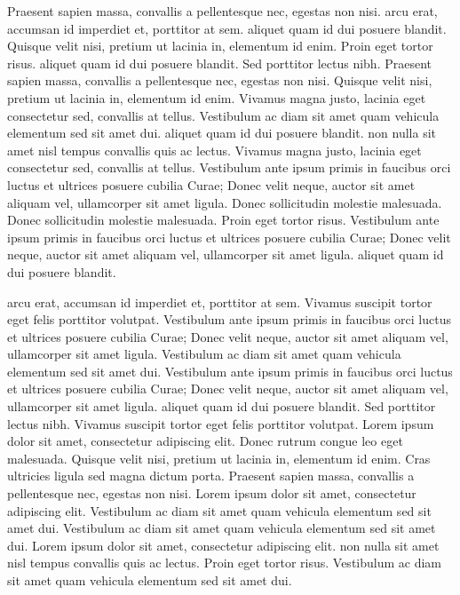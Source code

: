 \documentclass{article}
\begin{document}
Praesent sapien massa, convallis a pellentesque nec, egestas non nisi.  arcu erat, accumsan id imperdiet et, porttitor at sem.  aliquet quam id dui posuere blandit. Quisque velit nisi, pretium ut lacinia in, elementum id enim. Proin eget tortor risus.  aliquet quam id dui posuere blandit. Sed porttitor lectus nibh. Praesent sapien massa, convallis a pellentesque nec, egestas non nisi. Quisque velit nisi, pretium ut lacinia in, elementum id enim. Vivamus magna justo, lacinia eget consectetur sed, convallis at tellus. Vestibulum ac diam sit amet quam vehicula elementum sed sit amet dui.  aliquet quam id dui posuere blandit.  non nulla sit amet nisl tempus convallis quis ac lectus. Vivamus magna justo, lacinia eget consectetur sed, convallis at tellus. Vestibulum ante ipsum primis in faucibus orci luctus et ultrices posuere cubilia Curae; Donec velit neque, auctor sit amet aliquam vel, ullamcorper sit amet ligula. Donec sollicitudin molestie malesuada. Donec sollicitudin molestie malesuada. Proin eget tortor risus. Vestibulum ante ipsum primis in faucibus orci luctus et ultrices posuere cubilia Curae; Donec velit neque, auctor sit amet aliquam vel, ullamcorper sit amet ligula.  aliquet quam id dui posuere blandit.

 arcu erat, accumsan id imperdiet et, porttitor at sem. Vivamus suscipit tortor eget felis porttitor volutpat. Vestibulum ante ipsum primis in faucibus orci luctus et ultrices posuere cubilia Curae; Donec velit neque, auctor sit amet aliquam vel, ullamcorper sit amet ligula. Vestibulum ac diam sit amet quam vehicula elementum sed sit amet dui. Vestibulum ante ipsum primis in faucibus orci luctus et ultrices posuere cubilia Curae; Donec velit neque, auctor sit amet aliquam vel, ullamcorper sit amet ligula.  aliquet quam id dui posuere blandit. Sed porttitor lectus nibh. Vivamus suscipit tortor eget felis porttitor volutpat. Lorem ipsum dolor sit amet, consectetur adipiscing elit. Donec rutrum congue leo eget malesuada. Quisque velit nisi, pretium ut lacinia in, elementum id enim. Cras ultricies ligula sed magna dictum porta. Praesent sapien massa, convallis a pellentesque nec, egestas non nisi. Lorem ipsum dolor sit amet, consectetur adipiscing elit. Vestibulum ac diam sit amet quam vehicula elementum sed sit amet dui. Vestibulum ac diam sit amet quam vehicula elementum sed sit amet dui. Lorem ipsum dolor sit amet, consectetur adipiscing elit.  non nulla sit amet nisl tempus convallis quis ac lectus. Proin eget tortor risus. Vestibulum ac diam sit amet quam vehicula elementum sed sit amet dui.
\end{document}
